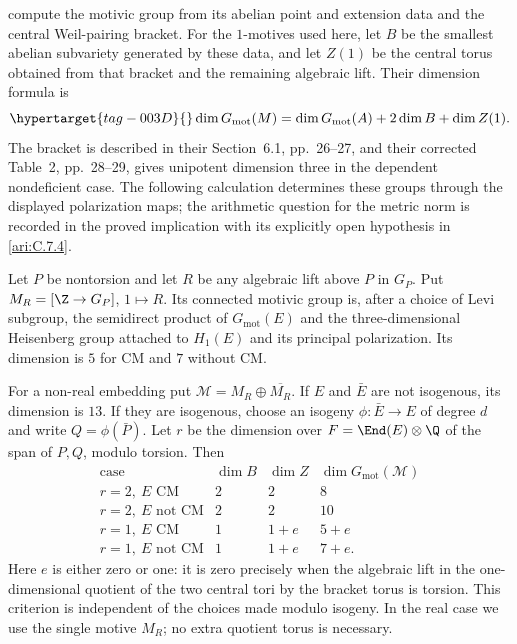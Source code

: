 \citet[Construction~3.4, p.~12, Lemma~3.5, p.~13, and
Proposition~4.12, pp.~19--20]{bertolin2022} compute the motivic
group from its abelian point and extension data and the central
Weil-pairing bracket. For the $1$-motives used here, let $B$ be the
smallest abelian subvariety generated by these data, and let $Z(1)$
be the central torus obtained from that bracket and the remaining
algebraic lift. Their dimension formula is
\begin{equation}\hypertarget{tag-003D}{}\label{ari:eq:cp-MTdim}
 \dim G_{\mathrm{mot}}(M)
 =\dim G_{\mathrm{mot}}(A)+2\dim B+\dim Z(1).
\end{equation}
The bracket is described in their Section~6.1, pp.~26--27, and
their corrected Table~2, pp.~28--29, gives unipotent dimension
three in the dependent nondeficient case. The following calculation
determines these groups through the displayed polarization maps;
the arithmetic question for the metric norm is recorded in the
proved implication with its explicitly open hypothesis in \cref{ari:C.7.4}.

\begin{proposition}\hypertarget{tag-001C}{}\label{ari:C.7.3}

Let $P$ be nontorsion and let $R$ be any algebraic lift above
$P$ in $G_P$. Put $M_R=[\Z\to G_P]$, $1\mapsto R$.
Its connected motivic group is, after a choice of Levi subgroup,
the semidirect product of $G_{\mathrm{mot}}(E)$ and the
three-dimensional Heisenberg group attached to $H_1(E)$ and
its principal polarization. Its dimension is $5$ for CM and
$7$ without CM.

For a non-real embedding put
$\mathcal M=M_R\oplus\overline{M_R}$.
If $E$ and $\bar E$ are not isogenous, its dimension is $13$.
If they are isogenous, choose an isogeny
$\phi:\bar E\to E$ of degree $d$ and write
$Q=\phi(\bar P)$. Let $r$ be the dimension over
$F=\End(E)\otimes\Q$ of the span of $P,Q$, modulo torsion.
Then
\[
\begin{array}{c|c|c|c}
\text{case}&\dim B&\dim Z&\dim G_{\mathrm{mot}}(\mathcal M)\\ \hline
r=2,\ E\text{ CM}&2&2&8\\
r=2,\ E\text{ not CM}&2&2&10\\
r=1,\ E\text{ CM}&1&1+e&5+e\\
r=1,\ E\text{ not CM}&1&1+e&7+e.
\end{array}
\]
Here $e$ is either zero or one: it is zero precisely when the
algebraic lift in the one-dimensional quotient of the two
central tori by the bracket torus is torsion. This criterion is
independent of the choices made modulo isogeny. In the real
case we use the single motive $M_R$; no extra quotient torus
is necessary.
\end{proposition}



